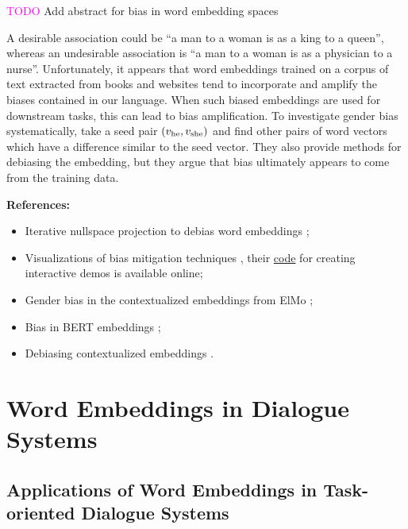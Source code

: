 \documentclass[11pt, a4paper]{amsart}
\begin{document}
\textcolor{magenta}{TODO} Add abstract for bias in word embedding spaces

{
	\color{blue}
	
	A desirable association could be ``a man to a woman is as a king to a queen'', whereas an undesirable association is ``a man to a woman is as a physician to a nurse''.
	Unfortunately, it appears that word embeddings trained on a corpus of text extracted from books and websites tend to incorporate and amplify the biases contained in our language.
	When such biased embeddings are used for downstream tasks, this can lead to bias amplification.
	To investigate gender bias systematically, \cite{DBLP:journals/corr/BolukbasiCZSK16a} take a seed pair $(v_\textup{he}, v_\textup{she})$ and find other pairs of word vectors which have a difference similar to the seed vector.
	They also provide methods for debiasing the embedding, but they argue that bias ultimately appears to come from the training data.
} %

\noindent \textbf{References:}
\begin{itemize}
	\item Iterative nullspace projection to debias word embeddings \cite{ravfogel-etal-2020-null};
	\item Visualizations of bias mitigation techniques \cite{DBLP:journals/corr/abs-2104-02797},
	their \href{https://github.com/tdavislab/verb}{code} for creating interactive demos is available online;
	\item Gender bias in the contextualized embeddings from ElMo \cite{zhao-etal-2019-gender};
	\item Bias in BERT embeddings \cite{kurita-etal-2019-measuring};
	\item Debiasing contextualized embeddings \cite{kaneko-bollegala-2021-debiasing}.
\end{itemize}

\section{Word Embeddings in Dialogue Systems}


\subsection{Applications of Word Embeddings in Task-oriented Dialogue Systems}
\end{document}
